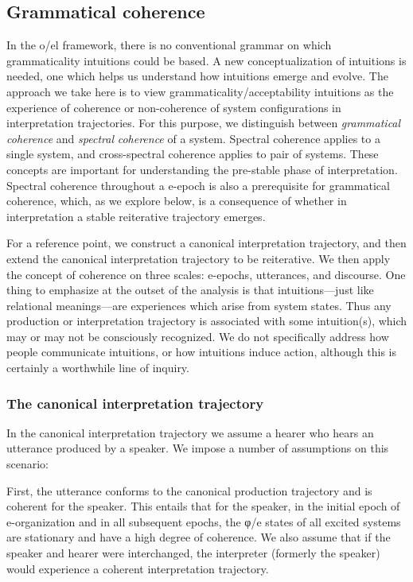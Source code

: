 \subsection{Grammatical coherence}

In the o/el framework, there is no conventional grammar on which grammaticality intuitions could be based. A new conceptualization of intuitions is needed, one which helps us understand how intuitions emerge and evolve. The approach we take here is to view grammaticality/acceptability intuitions as the experience of coherence or non-coherence of system configurations in interpretation trajectories. For this purpose, we distinguish between \textit{grammatical} \textit{coherence} and \textit{spectral} \textit{coherence} of a system. Spectral coherence applies to a single system, and cross-spectral coherence applies to pair of systems. These concepts are important for understanding the pre-stable phase of interpretation. Spectral coherence throughout a e-epoch is also a prerequisite for grammatical coherence, which, as we explore below, is a consequence of whether in interpretation a stable reiterative trajectory emerges.

For a reference point, we construct a canonical interpretation trajectory, and then extend the canonical interpretation trajectory to be reiterative. We then apply the concept of coherence on three scales: e-epochs, utterances, and discourse. One thing to emphasize at the outset of the analysis is that intuitions—just like relational meanings—are experiences which arise from system states. Thus any production or interpretation trajectory is associated with some intuition(s), which may or may not be consciously recognized. We do not specifically address how people communicate intuitions, or how intuitions induce action, although this is certainly a worthwhile line of inquiry.

\subsubsection{The canonical interpretation trajectory}

In the canonical interpretation trajectory we assume a hearer who hears an utterance produced by a speaker. We impose a number of assumptions on this scenario:

First, the utterance conforms to the canonical production trajectory and is coherent for the speaker. This entails that for the speaker, in the initial epoch of e-organization and in all subsequent epochs, the φ/e states of all excited systems are stationary and have a high degree of coherence. We also assume that if the speaker and hearer were interchanged, the interpreter (formerly the speaker) would experience a coherent interpretation trajectory. 

